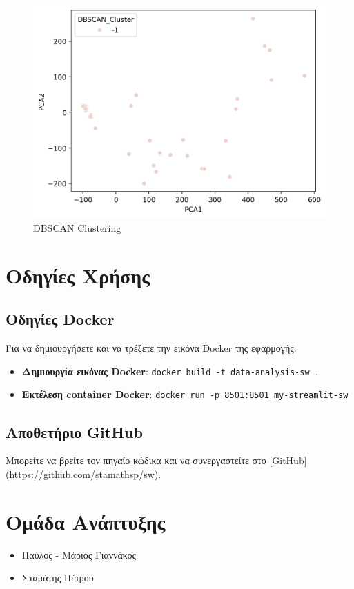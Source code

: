 \documentclass{article}
\begin{document}
\begin{figure}[h!]
    \centering
    \includegraphics[width=\textwidth]{DBSCAN_CLUSTERING.PNG}
    \caption{DBSCAN Clustering}
    \label{fig:dbscan}
\end{figure}

\section{Οδηγίες Χρήσης}
\subsection{Οδηγίες Docker}
Για να δημιουργήσετε και να τρέξετε την εικόνα Docker της εφαρμογής:
\begin{itemize}
    \item \textbf{Δημιουργία εικόνας Docker}: \texttt{docker build -t data-analysis-sw .}
    \item \textbf{Εκτέλεση container Docker}: \texttt{docker run -p 8501:8501 my-streamlit-sw}
\end{itemize}

\subsection{Αποθετήριο GitHub}
Μπορείτε να βρείτε τον πηγαίο κώδικα και να συνεργαστείτε στο [GitHub](https://github.com/stamathsp/sw).

\section{Ομάδα Ανάπτυξης}
\begin{itemize}
    \item Παύλος - Μάριος Γιαννάκος
    \item Σταμάτης Πέτρου
\end{itemize}
\end{document}
